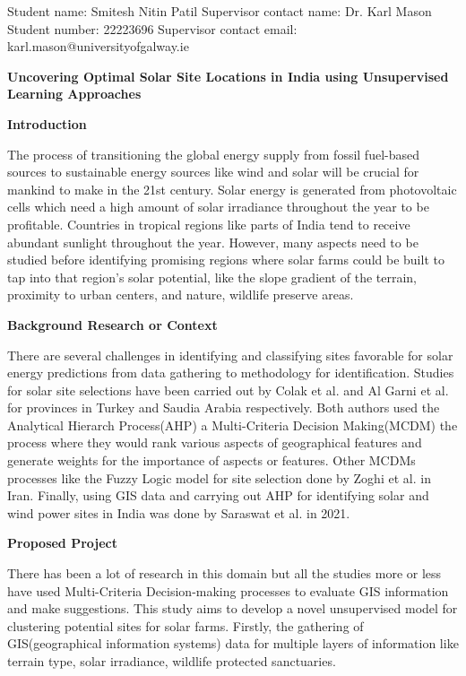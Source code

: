 \documentclass[11pt]{article}
\newcommand{\sect}[1]{\begin{center}\textbf{#1}\end{center}}
\begin{document}
	
\noindent Student name: Smitesh Nitin Patil \tabto{8cm} Supervisor contact name: Dr. Karl Mason \\
\noindent Student number: 22223696 \tabto{8cm} Supervisor contact email: karl.mason@universityofgalway.ie 
\vspace{0.2cm}

\sect{Uncovering Optimal Solar Site Locations in India using Unsupervised Learning Approaches}

\sect{Introduction}
The process of transitioning the global energy supply from fossil fuel-based sources to
sustainable energy sources like wind and solar will be crucial 
for mankind to make in the 21st century. Solar energy is generated from photovoltaic
cells which need a high amount of solar irradiance throughout the year to be profitable.
Countries in tropical regions like parts of India tend to receive abundant sunlight throughout 
the year. However, many aspects need to be studied before identifying promising regions where
solar farms could be built to tap into that region's solar potential, like the slope gradient of
the terrain, proximity to urban centers, and nature, wildlife preserve areas.
\sect{Background Research or Context}
There are several challenges in identifying and classifying sites favorable for solar energy
 predictions from data gathering to methodology for identification. Studies for solar site 
selections have been carried out by Colak et al.\cite{colak_memisoglu_gercek_2020} and 
Al Garni et al.\cite{al_garni_awasthi_2017} for provinces in Turkey and Saudia Arabia respectively. 
Both authors used the Analytical Hierarch Process(AHP) a Multi-Criteria Decision Making(MCDM)
 the process where they would rank various aspects of geographical features and generate weights for 
the importance of aspects or features. Other MCDMs processes like the Fuzzy Logic model for site 
selection done by Zoghi et al.\cite{zoghi_houshang_ehsani_sadat_javad_amiri_karimi_2017} in Iran. 
Finally, using GIS data and carrying out AHP for identifying solar and wind power sites in India was done 
by Saraswat et al. \cite{saraswat_digalwar_yadav_kumar_2021} in 2021.
\sect{Proposed Project}
There has been a lot of research in this domain but all the studies more or less have used Multi-Criteria
Decision-making processes to evaluate GIS information and make suggestions.
This study aims to develop a novel unsupervised model for clustering potential sites
for solar farms. Firstly, the gathering of GIS(geographical information systems) 
data for multiple layers of information like terrain type, solar irradiance, wildlife protected sanctuaries.
\end{document}
